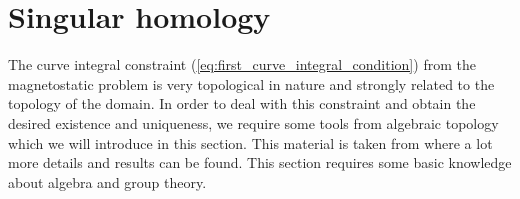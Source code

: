 \documentclass[../master_thesis.tex]{subfiles}
\begin{document}



\section{Singular homology}\label{sec:singular_homology}

The curve integral constraint (\ref{eq:first_curve_integral_condition}) 
from the magnetostatic problem is very topological
in nature and strongly related to the topology of the domain. 
In order to deal with this constraint and obtain the desired existence and
uniqueness, we require some tools from algebraic topology which we will introduce 
in this section. 
This material is taken from
\cite{topology_and_geometry} where a lot more details and results can be found.
This section requires some basic knowledge about algebra and group theory.
\end{document}
